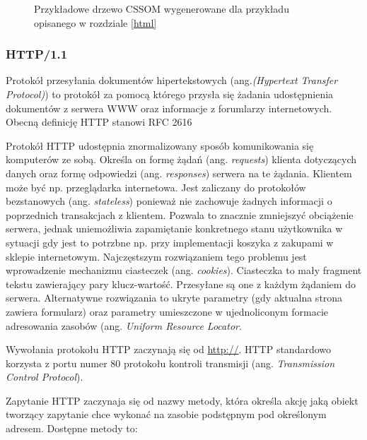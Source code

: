 \documentclass[polish, twoside, 12pt]{mwart}
\begin{document}
\begin{figure}
  \centering
  \caption{Przykładowe drzewo CSSOM wygenerowane dla przykładu opisanego w rozdziale \ref{html}}
\end{figure}
\subsubsection{HTTP/1.1} \label{http/1.1}

Protokół przesyłania dokumentów hipertekstowych (ang.\emph{(Hypertext Transfer Protocol)}) to protokół za pomocą którego przysła się żadania udostępnienia dokumentów z serwera WWW oraz informacje z forumlarzy internetowych. Obecną definicję HTTP stanowi RFC 2616 \cite{rfc2616}

Protokół HTTP udostępnia znormalizowany sposób komunikowania się komputerów ze sobą. Określa on formę żądań (ang. \emph{requests}) klienta dotyczących danych oraz formę odpowiedzi (ang. \emph{responses}) serwera na te żądania. Klientem może być np. przeglądarka internetowa. Jest zaliczany do protokołów bezstanowych (ang. \emph{stateless}) ponieważ nie zachowuje żadnych informacji o poprzednich transakcjach z klientem. Pozwala to znacznie zmniejszyć obciążenie serwera, jednak uniemożliwia zapamiętanie konkretnego stanu użytkownika w sytuacji gdy jest to potrzbne np. przy implementacji koszyka z zakupami w sklepie internetowym. Najczęstszym rozwiązaniem tego problemu jest wprowadzenie mechanizmu ciasteczek (ang. \emph{cookies}). Ciasteczka to mały fragment tekstu zawierający pary klucz-wartość. Przesyłane są one z każdym żądaniem do serwera. Alternatywne rozwiązania to ukryte parametry (gdy aktualna strona zawiera formularz) oraz parametry umieszczone w ujednoliconym formacie adresowania zasobów (ang. \emph{Uniform Resource Locator}.

Wywołania protokołu HTTP zaczynają się od \url{http://}. HTTP standardowo korzysta z portu numer 80 protokołu kontroli transmisji (ang. \emph{Transmission Control Protocol}).

Zapytanie HTTP zaczynaja się od nazwy metody, która określa akcję jaką obiekt tworzący zapytanie chce wykonać na zasobie podstępnym pod określonym adresem. Dostępne metody to:
\end{document}

